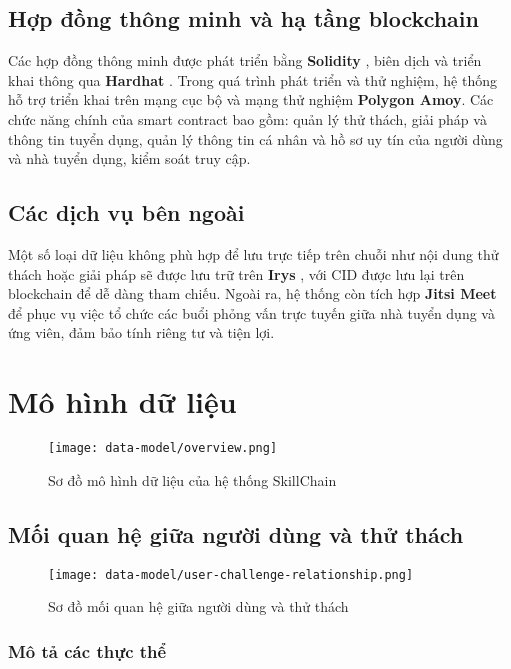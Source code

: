 \subsection{Hợp đồng thông minh và hạ tầng blockchain}

Các hợp đồng thông minh được phát triển bằng \textbf{Solidity} \cite{solidity-web}, biên dịch và triển khai thông qua \textbf{Hardhat} \cite{hardhat-web}. Trong quá trình phát triển và thử nghiệm, hệ thống hỗ trợ triển khai trên mạng cục bộ và mạng thử nghiệm \textbf{Polygon Amoy}.
Các chức năng chính của smart contract bao gồm: quản lý thử thách, giải pháp và thông tin tuyển dụng, quản lý thông tin cá nhân và hồ sơ uy tín của người dùng và nhà tuyển dụng, kiểm soát truy cập.

\subsection{Các dịch vụ bên ngoài}

Một số loại dữ liệu không phù hợp để lưu trực tiếp trên chuỗi như nội dung thử thách hoặc giải pháp sẽ được lưu trữ trên \textbf{Irys} \cite{irys-web}, với CID được lưu lại trên blockchain để dễ dàng tham chiếu.
Ngoài ra, hệ thống còn tích hợp \textbf{Jitsi Meet} \cite{jitsi-handbook-web} để phục vụ việc tổ chức các buổi phỏng vấn trực tuyến giữa nhà tuyển dụng và ứng viên, đảm bảo tính riêng tư và tiện lợi.

\section{Mô hình dữ liệu}

\begin{figure}[H]
  \centering
  \texttt{[image: data-model/overview.png]}
  \caption{Sơ đồ mô hình dữ liệu của hệ thống SkillChain}
  \label{fig:overview-relationship}
\end{figure}

\subsection{Mối quan hệ giữa người dùng và thử thách}
\begin{figure}[H]
  \centering
  \texttt{[image: data-model/user-challenge-relationship.png]}
  \caption{Sơ đồ mối quan hệ giữa người dùng và thử thách}
  \label{fig:user-challenge-relationship}
\end{figure}

\subsubsection{Mô tả các thực thể}

